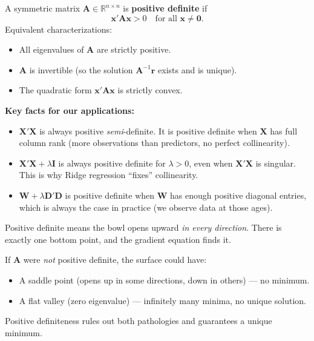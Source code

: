 \documentclass[11pt,a4paper]{article}
\begin{document}
\begin{formaldef}
A symmetric matrix $\bm{A} \in \mathbb{R}^{n \times n}$ is \textbf{positive definite} if
\[
\bm{x}'\bm{A}\bm{x} > 0 \quad \text{for all } \bm{x} \neq \bm{0}.
\]
Equivalent characterizations:
\begin{itemize}[nosep]
\item All eigenvalues of $\bm{A}$ are strictly positive.
\item $\bm{A}$ is invertible (so the solution $\bm{A}^{-1}\bm{r}$ exists and is unique).
\item The quadratic form $\bm{x}'\bm{A}\bm{x}$ is strictly convex.
\end{itemize}

\medskip
\textbf{Key facts for our applications:}
\begin{itemize}[nosep]
\item $\bm{X}'\bm{X}$ is always positive \emph{semi}-definite. It is positive definite when $\bm{X}$ has full column rank (more observations than predictors, no perfect collinearity).
\item $\bm{X}'\bm{X} + \lambda\bm{I}$ is always positive definite for $\lambda > 0$, even when $\bm{X}'\bm{X}$ is singular. This is why Ridge regression ``fixes'' collinearity.
\item $\bm{W} + \lambda\bm{D}'\bm{D}$ is positive definite when $\bm{W}$ has enough positive diagonal entries, which is always the case in practice (we observe data at those ages).
\end{itemize}
\end{formaldef}

\begin{intuition}
Positive definite means the bowl opens upward \emph{in every direction}. There is exactly one bottom point, and the gradient equation finds it.

If $\bm{A}$ were \emph{not} positive definite, the surface could have:
\begin{itemize}[nosep]
\item A saddle point (opens up in some directions, down in others) --- no minimum.
\item A flat valley (zero eigenvalue) --- infinitely many minima, no unique solution.
\end{itemize}
Positive definiteness rules out both pathologies and guarantees a unique minimum.
\end{intuition}

\end{document}
